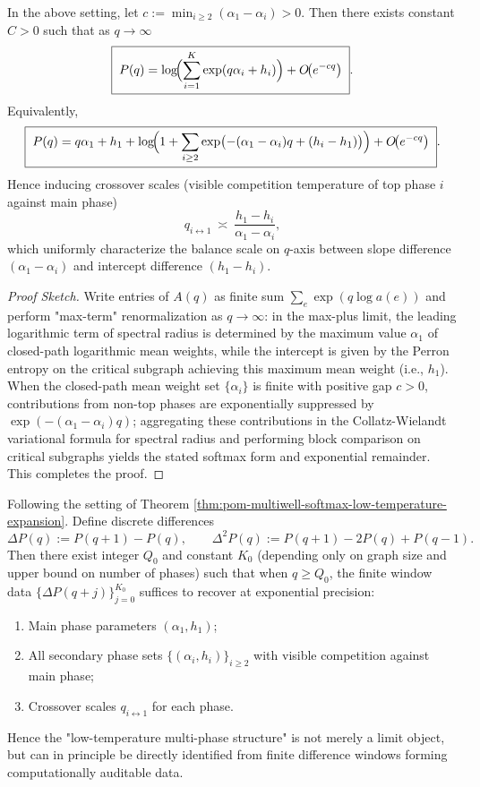\begin{theorem}\label{thm:pom-multiwell-softmax-low-temperature-expansion}
In the above setting, let
\(
c:=\min_{i\ge2}(\alpha_1-\alpha_i)>0
\).
Then there exists constant \(C>0\) such that as \(q\to\infty\)
\[
\boxed{\;
P(q)=\log\!\Bigl(\sum_{i=1}^{K}\exp(q\alpha_i+h_i)\Bigr)+O\!\bigl(e^{-cq}\bigr)\; }.
\]
Equivalently,
\[
\boxed{\;
P(q)=q\alpha_1+h_1+\log\!\Bigl(1+\sum_{i\ge2}\exp\bigl(-(\alpha_1-\alpha_i)q+(h_i-h_1)\bigr)\Bigr)+O\!\bigl(e^{-cq}\bigr)\; }.
\]
Hence inducing crossover scales (visible competition temperature of top phase \(i\) against main phase)
\[
q_{i\leftrightarrow 1}\ \asymp\ \frac{h_1-h_i}{\alpha_1-\alpha_i},
\]
which uniformly characterize the balance scale on \(q\)-axis between slope difference \((\alpha_1-\alpha_i)\) and intercept difference \((h_1-h_i)\).
\end{theorem}
\begin{proof}[Proof Sketch]
Write entries of \(A(q)\) as finite sum \(\sum_e \exp(q\log a(e))\) and perform "max-term" renormalization as \(q\to\infty\):
in the max-plus limit, the leading logarithmic term of spectral radius is determined by the maximum value \(\alpha_1\) of closed-path logarithmic mean weights,
while the intercept is given by the Perron entropy on the critical subgraph achieving this maximum mean weight (i.e., \(h_1\)).
When the closed-path mean weight set \(\{\alpha_i\}\) is finite with positive gap \(c>0\), contributions from non-top phases are exponentially suppressed by \(\exp(-(\alpha_1-\alpha_i)q)\);
aggregating these contributions in the Collatz-Wielandt variational formula for spectral radius and performing block comparison on critical subgraphs yields the stated softmax form and exponential remainder.
This completes the proof.
\end{proof}
\begin{theorem}\label{thm:pom-multiwell-top-parameter-identifiability}
Following the setting of Theorem \ref{thm:pom-multiwell-softmax-low-temperature-expansion}.
Define discrete differences
\[
\Delta P(q):=P(q+1)-P(q),
\qquad
\Delta^2 P(q):=P(q+1)-2P(q)+P(q-1).
\]
Then there exist integer \(Q_0\) and constant \(K_0\) (depending only on graph size and upper bound on number of phases) such that when \(q\ge Q_0\),
the finite window data \(\{\Delta P(q+j)\}_{j=0}^{K_0}\) suffices to recover at exponential precision:
\begin{enumerate}
  \item Main phase parameters \((\alpha_1,h_1)\);
  \item All secondary phase sets \(\{(\alpha_i,h_i)\}_{i\ge2}\) with visible competition against main phase;
  \item Crossover scales \(q_{i\leftrightarrow1}\) for each phase.
\end{enumerate}
Hence the "low-temperature multi-phase structure" is not merely a limit object, but can in principle be directly identified from finite difference windows forming computationally auditable data.
\end{theorem}
